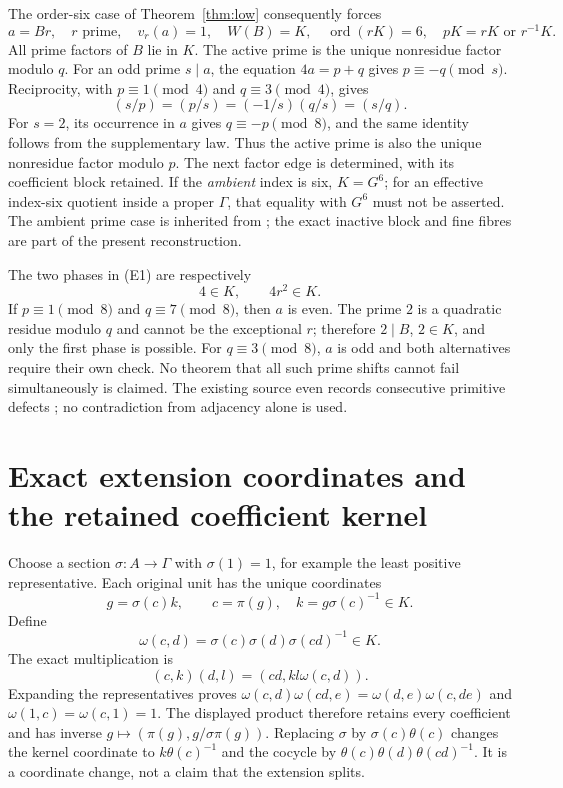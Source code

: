 The order-six case of Theorem~\ref{thm:low} consequently forces
\[
 \boxed{
 a=Br,\quad r\text{ prime},\quad v_r(a)=1,\quad W(B)=K,\quad
 \operatorname{ord}(rK)=6,\quad pK=rK\text{ or }r^{-1}K.}  \tag{E1}
\]
All prime factors of $B$ lie in $K$. The active prime is the unique nonresidue
factor modulo $q$. For an odd prime $s\mid a$, the equation $4a=p+q$
gives $p\equiv-q\pmod s$. Reciprocity, with $p\equiv1\pmod4$ and
$q\equiv3\pmod4$, gives
\[
 (s/p)=(p/s)=(-1/s)(q/s)=(s/q).
\]
For $s=2$, its occurrence in $a$ gives $q\equiv-p\pmod8$, and the same
identity follows from the supplementary law. Thus the active prime is also
the unique nonresidue factor modulo $p$. The next factor edge is determined,
with its coefficient block retained. If the \emph{ambient} index is six, $K=G^6$; for an effective
index-six quotient inside a proper $\Gamma$, that equality with $G^6$ must
not be asserted. The ambient prime case is inherited from
\cite[\S\S4--8]{BryanSix}; the exact inactive block and fine fibres are part
of the present reconstruction.

The two phases in (E1) are respectively
\[
 4\in K,\qquad 4r^2\in K.                                \tag{E2}
\]
If $p\equiv1\pmod8$ and $q\equiv7\pmod8$, then $a$ is even. The prime
$2$ is a quadratic residue modulo $q$ and cannot be the exceptional $r$;
therefore $2\mid B$, $2\in K$, and only the first phase is possible.
For $q\equiv3\pmod8$, $a$ is odd and both alternatives require their own
check. No theorem that all such prime shifts cannot fail simultaneously
is claimed. The existing source even records consecutive primitive defects
\cite[\S\S1--3]{BryanChain}; no contradiction from adjacency alone is used.

\section{Exact extension coordinates and the retained coefficient kernel}
Choose a section $\sigma:A\to\Gamma$ with $\sigma(1)=1$, for example the
least positive representative. Each original unit has the unique coordinates
\[
 g=\sigma(c)k,\qquad c=\pi(g),\quad k=g\sigma(c)^{-1}\in K.
\]
Define
\[
 \omega(c,d)=\sigma(c)\sigma(d)\sigma(cd)^{-1}\in K.
\]
The exact multiplication is
\[
 \boxed{(c,k)(d,l)=(cd,kl\omega(c,d)).}                    \tag{F1}
\]
Expanding the representatives proves
$\omega(c,d)\omega(cd,e)=\omega(d,e)\omega(c,de)$ and
$\omega(1,c)=\omega(c,1)=1$. The displayed product therefore retains every
coefficient and has inverse $g\mapsto(\pi(g),g/\sigma\pi(g))$.
Replacing $\sigma$ by $\sigma(c)\theta(c)$ changes the kernel coordinate to
$k\theta(c)^{-1}$ and the cocycle by
$\theta(c)\theta(d)\theta(cd)^{-1}$. It is a coordinate change, not a
claim that the extension splits.

